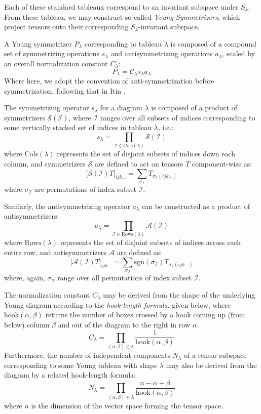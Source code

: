 \documentclass[10pt,a4paper]{article}
\begin{document}
Each of these standard tableaux correspond to an invariant subspace under $S_k$. From these tableau, we may construct so-called \textit{Young Symmetrizers}, which project tensors onto their corresponding $S_k$-invariant subspace. 

A Young symmetrizer $P_{\lambda}$ corresponding to tableau $\lambda$ is composed of a compound set of symmetrizing operations $s_{\lambda}$ and antisymmetrizing operations $a_{\lambda}$, scaled by an overall normalization constant $C_{\lambda}$:
$$
P_{\lambda} = \mathcal{C}_{\lambda}s_{\lambda}a_{\lambda}
$$
Where here, we adopt the convention of anti-symmetrization before symmetrization, following that in Itin \cite{Itin-r3}.

The symmetrizing operator $s_{\lambda}$ for a diagram $\lambda$ is composed of a product of symmetrizers $\mathcal{S}(\mathcal{I})$, where $\mathcal{I}$ ranges over all subsets of indices corresponding to some vertically stacked set of indices in tableau $\lambda$, i.e.:
$$
s_{\lambda} = \prod_{\mathcal{I}\in \text{Cols}(\lambda)}\mathcal{S}(\mathcal{I})
$$
where $\text{Cols}(\lambda)$ represents the set of disjoint subsets of indices down each column, and symmetrizers $\mathcal{S}$ are defined to act on tensors $T$ component-wise as:
$$
\big[\mathcal{S}(\mathcal{I})T\big]_{ijk...}= \sum_{\sigma_{\mathcal{I}}}T_{\sigma_{\mathcal{I}}(ijk...)}
$$
where $\sigma_{\mathcal{I}}$ are permutations of index subset $\mathcal{I}$.

Similarly, the antisymmetrizing operator $a_{\lambda}$ can be constructed as a product of antisymmetrizers:
$$
a_{\lambda} = \prod_{\mathcal{I}\in \text{Rows}(\lambda)}\mathcal{A}(\mathcal{I})
$$
where $\text{Rows}(\lambda)$ represents the set of  disjoint subsets of indices across each entire row, and antisymmetrizers $\mathcal{A}$ are defined as:
$$
\big[\mathcal{A}(\mathcal{I})T\big]_{ijk...}= \sum_{\sigma_{\mathcal{I}}}\text{sgn}(\sigma_{\mathcal{I}})T_{\sigma_{\mathcal{I}}(ijk...)}
$$
where, again, $\sigma_{\mathcal{I}}$ range over all permutations of index subset $\mathcal{I}$.



The normalization constant $C_{\lambda}$ may be derived from the shape of the underlying Young diagram according to the \textit{hook-length formula}, given below, where $\text{hook}(\alpha,\beta)$ returns the number of boxes crossed by a hook coming up (from below) column $\beta$ and out of the diagram to the right in row $\alpha$.
$$
C_{\lambda}= \prod_{(\alpha,\beta)\in \lambda}\frac{1}{\text{hook}(\alpha,\beta)}
$$
Furthermore, the number of independent components $N_{\lambda}$ of a tensor subspace corresponding to some Young tableau with shape $\lambda$ may also be derived from the diagram by a related hook-length formula:
$$
N_{\lambda}= \prod_{(\alpha,\beta)\in \lambda}\frac{n-\alpha+\beta}{\text{hook}(\alpha,\beta)}
$$
where $n$ is the dimension of the vector space forming the tensor space. 
\end{document}
